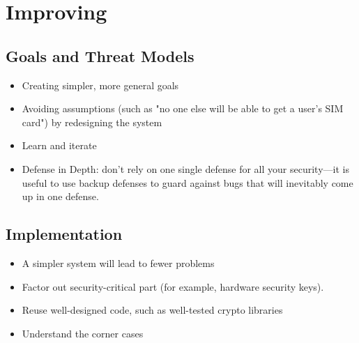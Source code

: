 \section{Improving}
\subsection{Goals and Threat Models}
\begin{itemize}
	\item Creating simpler, more general goals
	\item Avoiding assumptions (such as "no one else will be able to get a user's SIM card") by redesigning the system
	\item Learn and iterate
	\item Defense in Depth: don't rely on one single defense for all your security---it is useful to use backup defenses to guard against bugs that will inevitably come up in one defense.
\end{itemize}

\subsection{Implementation}
\begin{itemize}
	\item A simpler system will lead to fewer problems
	\item Factor out security-critical part (for example, hardware security keys).
	\item Reuse well-designed code, such as well-tested crypto libraries
	\item Understand the corner cases
\end{itemize}



